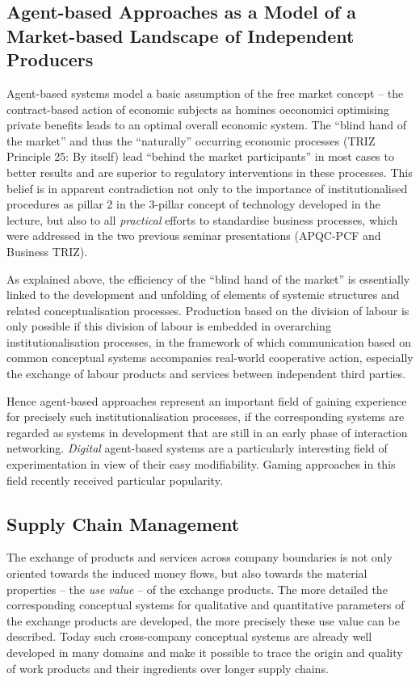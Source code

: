 \documentclass[11pt,a4paper]{article}
\begin{document}
\subsection{Agent-based Approaches as a Model of a Market-based Landscape of
  Independent Producers} 

Agent-based systems model a basic assumption of the free market concept -- the
contract-based action of economic subjects as homines oeconomici optimising
private benefits leads to an optimal overall economic system. The
\enquote{blind hand of the market} and thus the \enquote{naturally} occurring
economic processes (TRIZ Principle 25: By itself) lead \enquote{behind the
  market participants} in most cases to better results and are superior to
regulatory interventions in these processes. This belief is in apparent
contradiction not only to the importance of institutionalised procedures as
pillar 2 in the 3-pillar concept of technology developed in the lecture, but
also to all \emph{practical} efforts to standardise business processes, which
were addressed in the two previous seminar presentations (APQC-PCF and
Business TRIZ).

As explained above, the efficiency of the \enquote{blind hand of the market}
is essentially linked to the development and unfolding of elements of systemic
structures and related conceptualisation processes. Production based on the
division of labour is only possible if this division of labour is embedded in
overarching institutionalisation processes, in the framework of which
communication based on common conceptual systems accompanies real-world
cooperative action, especially the exchange of labour products and services
between independent third parties.

Hence agent-based approaches represent an important field of gaining
experience for precisely such institutionalisation processes, if the
corresponding systems are regarded as systems in development that are still in
an early phase of interaction networking. \emph{Digital} agent-based systems
are a particularly interesting field of experimentation in view of their easy
modifiability. Gaming approaches in this field recently received particular
popularity.

\subsection{Supply Chain Management}

The exchange of products and services across company boundaries is not only
oriented towards the induced money flows, but also towards the material
properties -- the \emph{use value} -- of the exchange products. The more
detailed the corresponding conceptual systems for qualitative and quantitative
parameters of the exchange products are developed, the more precisely these
use value can be described. Today such cross-company conceptual systems are
already well developed in many domains and make it possible to trace the
origin and quality of work products and their ingredients over longer supply
chains.
\end{document}
